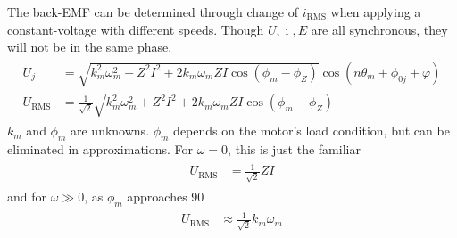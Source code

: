\documentclass[12pt,a4paper,oneside,openany]{article}
\begin{document}
The back-EMF can be determined through change of $i_{\textrm{RMS}}$ when applying a constant-voltage with different speeds. Though $U, \imath, E$ are all synchronous, they will not be in the same phase.
\begin{gather}
\begin{aligned}
U_j &= \sqrt{ k_m^2\omega_m^2 + Z^2I^2  + 2 k_m \omega_m Z I \cos \left(\phi_m - \phi_Z \right)} \cos \left( n \theta_m + \phi_{0j} + \varphi \right) \\
U_{\textrm{RMS}} &= \frac{1}{\sqrt{2}} \sqrt{ k_m^2\omega_m^2 + Z^2I^2  + 2 k_m \omega_m Z I \cos \left( \phi_m - \phi_Z \right)}
\end{aligned}
\end{gather}
$k_m$ and $\phi_m$ are unknowns. $\phi_m$ depends on the motor's load condition, but can be eliminated in approximations. For $\omega = 0$, this is just the familiar
\begin{gather}
\begin{aligned}
U_{\textrm{RMS}} &= \frac{1}{\sqrt{2}} ZI
\end{aligned}
\end{gather}
and for $\omega \gg 0$, as $\phi_m$ approaches \unit{90}{\degree}
\begin{gather}
\begin{aligned}
U_{\textrm{RMS}} &\approx \frac{1}{\sqrt{2}} k_m \omega_m
\end{aligned}
\end{gather}
\end{document}
